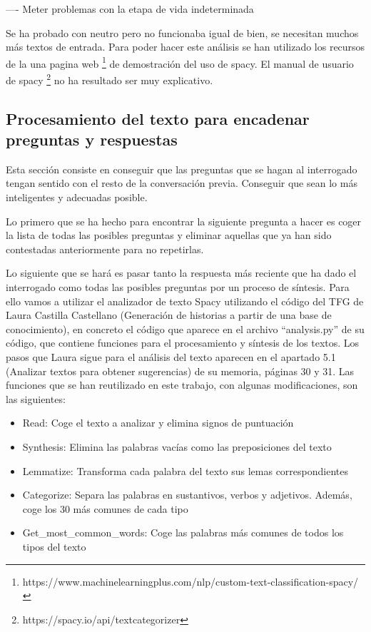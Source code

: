 ---- Meter problemas con la etapa de vida indeterminada 

Se ha probado con neutro pero no funcionaba igual de bien, se necesitan muchos más textos de entrada. Para poder hacer este análisis se han utilizado los recursos de la una pagina web \footnote{https://www.machinelearningplus.com/nlp/custom-text-classification-spacy/} de demostración del uso de spacy. El manual de usuario de spacy \footnote{https://spacy.io/api/textcategorizer} no ha resultado ser muy explicativo.

\subsection{Procesamiento del texto para encadenar preguntas y respuestas}
 
Esta sección consiste en conseguir que las preguntas que se hagan al interrogado tengan sentido con el resto de la conversación previa. Conseguir que sean lo más inteligentes y adecuadas posible. 

Lo primero que se ha hecho para encontrar la siguiente pregunta a hacer es coger la lista de todas las posibles preguntas y eliminar aquellas que ya han sido contestadas anteriormente para no repetirlas. 

Lo siguiente que se hará es pasar tanto la respuesta más reciente que ha dado el interrogado como todas las posibles preguntas por un proceso de síntesis. Para ello vamos a utilizar el analizador de texto Spacy utilizando el código del TFG de Laura Castilla Castellano (Generación de historias a partir de una base de conocimiento), en concreto el código que aparece en el archivo ``analysis.py'' de su código, que contiene funciones para el procesamiento y síntesis de los textos. Los pasos que Laura sigue para el análisis del texto aparecen en el apartado 5.1 (Analizar textos para obtener sugerencias) de su memoria, páginas 30 y 31. Las funciones que se han reutilizado en este trabajo, con algunas modificaciones, son las siguientes:
\begin{itemize}
	\item Read: Coge el texto a analizar y elimina signos de puntuación
	\item Synthesis: Elimina las palabras vacías como las preposiciones del texto
	\item Lemmatize: Transforma cada palabra del texto sus lemas correspondientes
	\item Categorize: Separa las palabras en sustantivos, verbos y adjetivos. Además, coge los 30 más comunes de cada tipo
	\item Get\_most\_common\_words: Coge las palabras más comunes de todos los tipos del texto
\end{itemize}

